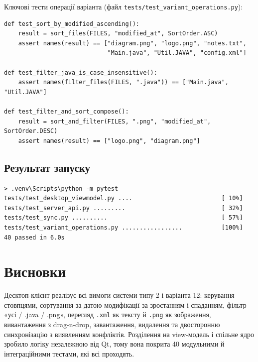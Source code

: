 \documentclass[12pt,a4paper]{article}
\begin{document}
Ключові тести операції варіанта (файл \texttt{tests/\allowbreak{}test\_variant\_operations.py}):

\begin{Verbatim}[fontsize=\small,frame=single]
def test_sort_by_modified_ascending():
    result = sort_files(FILES, "modified_at", SortOrder.ASC)
    assert names(result) == ["diagram.png", "logo.png", "notes.txt",
                             "Main.java", "Util.JAVA", "config.xml"]

def test_filter_java_is_case_insensitive():
    assert names(filter_files(FILES, ".java")) == ["Main.java", "Util.JAVA"]

def test_filter_and_sort_compose():
    result = sort_and_filter(FILES, ".png", "modified_at", SortOrder.DESC)
    assert names(result) == ["logo.png", "diagram.png"]
\end{Verbatim}

\subsection{Результат запуску}

\begin{Verbatim}[fontsize=\small,frame=single]
> .venv\Scripts\python -m pytest
tests/test_desktop_viewmodel.py ....                         [ 10%]
tests/test_server_api.py .........                           [ 32%]
tests/test_sync.py ..........                                [ 57%]
tests/test_variant_operations.py .................           [100%]
40 passed in 6.0s
\end{Verbatim}


\section{Висновки}

Десктоп-клієнт реалізує всі вимоги системи типу 2 і варіанта 12: керування стовпцями, сортування за датою модифікації за зростанням і спаданням, фільтр «усі / .java / .png», перегляд \texttt{.xml} як тексту й \texttt{.png} як зображення, вивантаження з drag-n-drop, завантаження, видалення та двосторонню синхронізацію з виявленням конфліктів. Розділення на view-модель і спільне ядро зробило логіку незалежною від Qt, тому вона покрита 40 модульними й інтеграційними тестами, які всі проходять.
\end{document}
